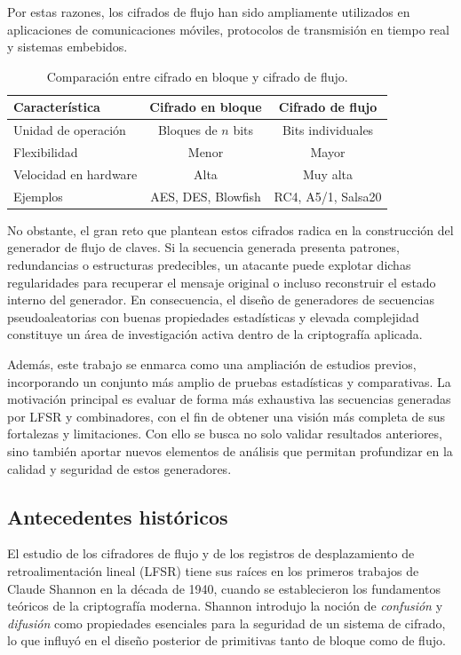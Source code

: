 Por estas razones, los cifrados de flujo han sido ampliamente utilizados en aplicaciones
de comunicaciones móviles, protocolos de transmisión en tiempo real y sistemas
embebidos.

\begin{table}[h]
\centering
\begin{tabular}{l|c|c}
\textbf{Característica} & \textbf{Cifrado en bloque} & \textbf{Cifrado de flujo} \\
\hline
Unidad de operación & Bloques de $n$ bits & Bits individuales \\
Flexibilidad & Menor & Mayor \\
Velocidad en hardware & Alta & Muy alta \\
Ejemplos & AES, DES, Blowfish & RC4, A5/1, Salsa20 \\
\end{tabular}
\caption{Comparación entre cifrado en bloque y cifrado de flujo.}
\end{table}


No obstante, el gran reto que plantean estos cifrados radica en la construcción
del generador de flujo de claves. Si la secuencia generada presenta patrones,
redundancias o estructuras predecibles, un atacante puede explotar dichas
regularidades para recuperar el mensaje original o incluso reconstruir el
estado interno del generador. En consecuencia, el diseño de generadores de
secuencias pseudoaleatorias con buenas propiedades estadísticas y elevada
complejidad constituye un área de investigación activa dentro de la
criptografía aplicada.

Además, este trabajo se enmarca como una ampliación de estudios previos,
incorporando un conjunto más amplio de pruebas estadísticas y comparativas. La
motivación principal es evaluar de forma más exhaustiva las secuencias generadas
por LFSR y combinadores, con el fin de obtener una visión más completa de sus
fortalezas y limitaciones. Con ello se busca no solo validar resultados
anteriores, sino también aportar nuevos elementos de análisis que permitan
profundizar en la calidad y seguridad de estos generadores.

\subsection*{Antecedentes históricos}

El estudio de los cifradores de flujo y de los registros de desplazamiento de
retroalimentación lineal (LFSR) tiene sus raíces en los primeros trabajos de
Claude Shannon en la década de 1940, cuando se establecieron los fundamentos
teóricos de la criptografía moderna. Shannon introdujo la noción de
\textit{confusión} y \textit{difusión} como propiedades esenciales para la
seguridad de un sistema de cifrado, lo que influyó en el diseño posterior de
primitivas tanto de bloque como de flujo.


